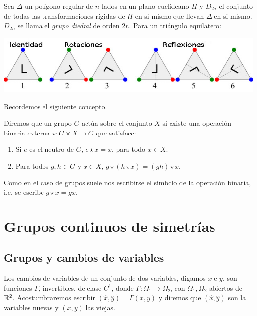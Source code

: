 \begin{ejemplo}{} Sea $\Delta$ un polígono regular de $n$ lados  en un plano euclideano $\Pi$ y $D_{2n}$ el conjunto de todas las transformaciones rígidas de $\Pi$ en si mismo que llevan $\Delta$ en si mismo. $D_{2n}$ se llama el \href{http://es.wikipedia.org/wiki/Grupo_diedral}{\emph{grupo diedral}}  de orden $2n$. Para un triángulo equilatero:
\begin{center}
\includegraphics[scale=.4]{imagenes/SimTria.jpg}
\end{center}
\end{ejemplo}

Recordemos el siguiente concepto.

\begin{definicion}
Diremos que un grupo $G$ actúa sobre el conjunto $X$ si existe una operación binaria externa  $\star:G\times X\to G$ que satisface:
\begin{enumerate}
\item Si $e$ es el neutro de $G$, $e \star x=x$,  para todo $x\in X$.
\item Para todos $g,h\in G$ y $x\in X$,    $g\star (h\star x)=(gh)\star x$.
\end{enumerate}
\end{definicion}

Como en el caso de grupos suele nos escribirse el símbolo de la operación binaria, i.e. se escribe $g\star x= gx$.




\section{Grupos continuos de simetrías}

\subsection{Grupos y cambios de variables}

Los cambios de variables de un conjunto de dos variables, digamos $x$ e $y$, son funciones $\Gamma$, invertibles,  de clase $C^1$, donde $\Gamma:\Omega_1\to\Omega_2$, con $\Omega_1,\Omega_2$ abiertos de $\mathbb{R}^2$.  Acostumbraremos escribir $(\hat{x},\hat{y})=\Gamma(x,y)$ y diremos que $(\hat{x},\hat{y})$ son la variables nuevas y $(x,y)$ las viejas.

